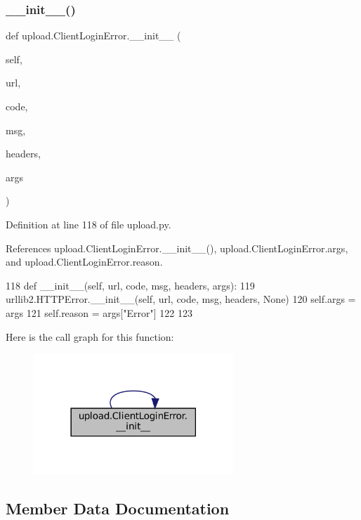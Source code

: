 \subsubsection{\texorpdfstring{\+\_\+\+\_\+init\+\_\+\+\_\+()}{\_\_init\_\_()}\hspace{0.1cm}{\footnotesize\ttfamily [2/2]}}
{\footnotesize\ttfamily def upload.\+Client\+Login\+Error.\+\_\+\+\_\+init\+\_\+\+\_\+ (\begin{DoxyParamCaption}\item[{}]{self,  }\item[{}]{url,  }\item[{}]{code,  }\item[{}]{msg,  }\item[{}]{headers,  }\item[{}]{args }\end{DoxyParamCaption})}



Definition at line 118 of file upload.\+py.



References upload.\+Client\+Login\+Error.\+\_\+\+\_\+init\+\_\+\+\_\+(), upload.\+Client\+Login\+Error.\+args, and upload.\+Client\+Login\+Error.\+reason.


\begin{DoxyCode}
118   \textcolor{keyword}{def }\_\_init\_\_(self, url, code, msg, headers, args):
119     urllib2.HTTPError.\_\_init\_\_(self, url, code, msg, headers, \textcolor{keywordtype}{None})
120     self.args = args
121     self.reason = args[\textcolor{stringliteral}{"Error"}]
122 
123 
\end{DoxyCode}
Here is the call graph for this function\+:
\nopagebreak
\begin{figure}[H]
\begin{center}
\leavevmode
\includegraphics[width=213pt]{classupload_1_1ClientLoginError_a1e590616c2976d881e155958cedbbe47_cgraph}
\end{center}
\end{figure}


\subsection{Member Data Documentation}
\mbox{\label{classupload_1_1ClientLoginError_ac300a0b034b2bc64cedc51e09fb6d663}} 
